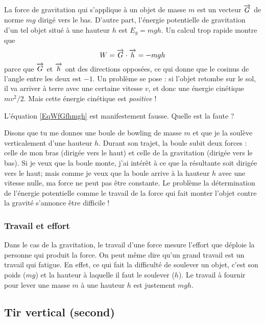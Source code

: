 La force de gravitation qui s'applique à un objet de masse $m$ est un vecteur $\overrightarrow{G}$ de norme $mg$ dirigé vers le bas. D'autre part,  l'énergie potentielle de gravitation d'un tel objet situé à une hauteur $h$ est $E_g=mgh$. Un calcul trop rapide montre que 
\begin{equation}		\label{EqWfGfhmgh}
	W=\overrightarrow{G}\cdot\overrightarrow{h}=-mgh
\end{equation}
parce que $\overrightarrow{G}$ et $\overrightarrow{h}$ ont des directions opposées, ce qui donne que le cosinus de l'angle entre les deux est $-1$. Un problème se pose : si l'objet retombe sur le sol, il va arriver à terre avec une certaine vitesse $v$, et donc une énergie cinétique $mv^2/2$. Mais cette énergie cinétique est \emph{positive} !

\begin{probleme}
	L'équation \eqref{EqWfGfhmgh} est manifestement fausse. Quelle est la faute ?
\end{probleme}

Disons que tu me donnes une boule de bowling de masse $m$ et que je la soulève verticalement d'une hauteur $h$. Durant son trajet, la boule subit deux forces : celle de mon bras (dirigée vers le haut) et celle de la gravitation (dirigée vers le bas). Si je veux que la boule monte, j'ai intérêt à ce que la résultante soit dirigée vers le haut; mais comme je veux que la boule arrive à la hauteur $h$ avec une vitesse nulle, ma force ne peut pas être constante. Le problème la détermination de l'énergie potentielle comme le travail de la force qui fait monter l'objet contre la gravité s'annonce être difficile !

\subsubsection{Travail et effort}

Dans le cas de la gravitation, le travail d'une force mesure l'effort que déploie la personne qui produit la force. On peut même dire qu'un grand travail est un travail qui fatigue. En effet, ce qui fait la difficulté de soulever un objet, c'est son poids ($mg$) et la hauteur à laquelle il faut le soulever ($h$). Le travail à fournir pour lever une masse $m$ à une hauteur $h$ est justement $mgh$.

\subsection{Tir vertical (second)}
\label{SubsecTirVecrtical}

